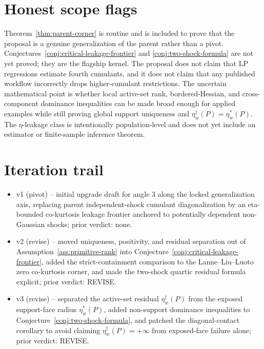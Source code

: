 \documentclass[11pt]{article}
\theoremstyle{definition}
\theoremstyle{plain}
\theoremstyle{remark}
\begin{document}
\section{Honest scope flags}
Theorem~\ref{thm:parent-corner} is routine and is included to prove that the proposal is a genuine generalization of the parent rather than a pivot.  Conjectures~\ref{conj:critical-leakage-frontier} and \ref{conj:two-shock-formula} are not yet proved; they are the flagship kernel.  The proposal does not claim that LP regressions estimate fourth cumulants, and it does not claim that any published workflow incorrectly drops higher-cumulant restrictions.  The uncertain mathematical point is whether local active-set rank, bordered-Hessian, and cross-component dominance inequalities can be made broad enough for applied examples while still proving global support uniqueness and \(\eta_w^\dagger(P)=\eta_w^*(P)\).  The \(\eta\)-leakage class is intentionally population-level and does not yet include an estimator or finite-sample inference theorem.

\section{Iteration trail}
\begin{itemize}[leftmargin=*]
\item v1 (pivot) -- initial upgrade draft for angle 3 along the locked generalization axis, replacing parent independent-shock cumulant diagonalization by an eta-bounded co-kurtosis leakage frontier anchored to potentially dependent non-Gaussian shocks; prior verdict: none.
\item v2 (revise) -- moved uniqueness, positivity, and residual separation out of Assumption~\ref{ass:primitive-rank} into Conjecture~\ref{conj:critical-leakage-frontier}, added the strict-containment comparison to the Lanne--Liu--Luoto zero co-kurtosis corner, and made the two-shock quartic residual formula explicit; prior verdict: REVISE.
\item v3 (revise) -- separated the active-set residual \(\eta_w^\dagger(P)\) from the exposed support-face radius \(\eta_w^*(P)\), added non-support dominance inequalities to Conjecture~\ref{conj:two-shock-formula}, and patched the diagonal-contact corollary to avoid claiming \(\eta_w^\dagger(P)=+\infty\) from exposed-face failure alone; prior verdict: REVISE.
\end{itemize}
\end{document}
